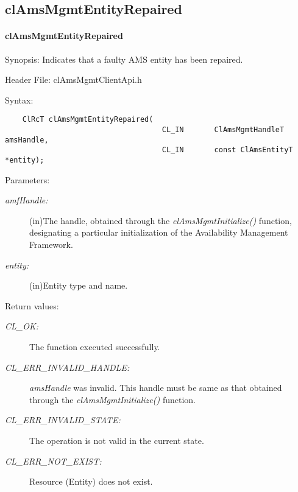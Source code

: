 \subsection{clAmsMgmtEntityRepaired}
\hypertarget{pageams115}{}\paragraph{cl\-Ams\-Mgmt\-Entity\-Repaired}\label{pageams115}
\begin{Desc}
\item[Synopsis:]Indicates that a faulty AMS entity has been repaired.\end{Desc}
\begin{Desc}
\item[Header File:]clAmsMgmtClientApi.h\end{Desc}
\begin{Desc}
\item[Syntax:]

\footnotesize\begin{verbatim}    ClRcT clAmsMgmtEntityRepaired(
                               		CL_IN       ClAmsMgmtHandleT            amsHandle,
                               		CL_IN       const ClAmsEntityT          *entity);
\end{verbatim}
\normalsize
\end{Desc}
\begin{Desc}
\item[Parameters:]
\begin{description}
\item[{\em amf\-Handle:}](in)The handle, obtained through the \textit{clAmsMgmtInitialize()} function, designating a particular initialization of the
Availability Management Framework. \item[{\em entity:}](in)Entity type and name.\end{description}
\end{Desc}
\begin{Desc}
\item[Return values:]
\begin{description}
\item[{\em CL\_\-OK:}]The function executed successfully. \item[{\em CL\_\-ERR\_\-INVALID\_\-HANDLE:}]{\em ams\-Handle\/} was invalid. This handle must be same as that obtained through the \textit{clAmsMgmtInitialize()} function. \item[{\em CL\_\-ERR\_\-INVALID\_\-STATE:}]The operation is not valid in the current state. \item[{\em CL\_\-ERR\_\-NOT\_\-EXIST:}]Resource (Entity) does not exist.\end{description}
\end{Desc}
